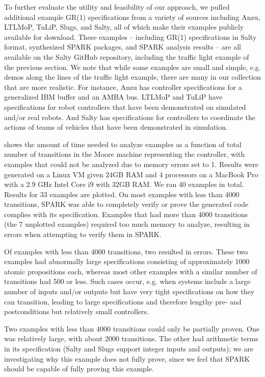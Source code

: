 \documentclass[runningheads]{llncs}
\begin{document}
To further evaluate the utility and feasibility of our approach, we pulled additional example GR(1) specifications from a variety of sources including 
Anzu, LTLMoP, TuLiP, Slugs, and Salty, all of which make their examples publicly available for download. 
These examples -- including GR(1) specifications in Salty format, synthesized SPARK packages, and SPARK analysis results -- are all available on the 
Salty GitHub repository, including the traffic light example of the previous section. 
We note that while some examples are small and simple, e.g. demos along the lines of the traffic light example, 
there are many in our collection that are more realistic. 
For instance, Anzu has controller specifications for a generalized IBM buffer and an AMBA bus. 
LTLMoP and TuLiP have specifications for robot controllers that have been demonstrated on simulated and/or real robots. 
And Salty has specifications for controllers to coordinate the actions of teams of vehicles that have been demonstrated in simulation. 

 shows the amount of time needed to analyze examples as a function of total number of transitions 
in the Moore machine representing the controller, 
with examples that could not be analyzed due to memory errors set to 1. 
Results were generated on a Linux VM given 24GB RAM and 4 processors on a MacBook Pro with a 2.9 GHz Intel Core i9 with 32GB RAM.
We ran 40 examples in total. 
Results for 33 examples are plotted. 
On most examples with less than 4000 transitions, 
SPARK was able to completely verify or prove the generated code complies with its specification. 
Examples that had more than 4000 transitions (the 7 unplotted examples) required too much memory to analyze, 
resulting in errors when attempting to verify them in SPARK. 

Of examples with less than 4000 transitions, two resulted in errors. 
These two examples had abnormally large specifications consisting of approximately 1000 atomic propositions each, 
whereas most other examples with a similar number of transitions had 500 or less. 
Such cases occur, e.g. when systems include a large number of inputs and/or outputs but have very tight specifications on 
how they can transition, leading to large specifications and therefore lengthy pre- and postconditions but relatively small controllers.

Two examples with less than 4000 transitions could only be partially proven. 
One was relatively large, with about 2000 transitions. 
The other had arithmetic terms in its specification (Salty and Slugs support integer inputs and outputs); 
we are investigating why this example does not fully prove, 
since we feel that SPARK should be capable of fully proving this example.
\end{document}
